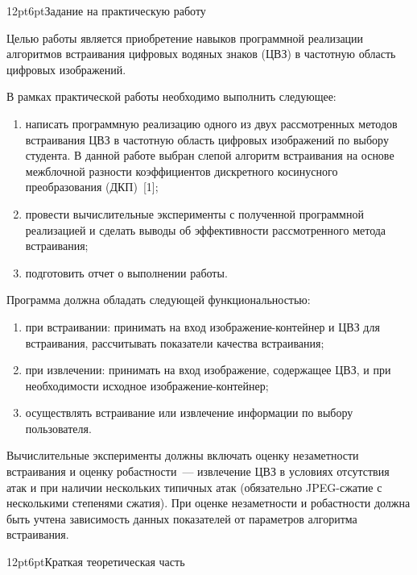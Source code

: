 \documentclass[12pt,a4paper]{article}
\makeatletter
\renewcommand\section{\@startsection{section}{1}{\z@}%
  {12pt}{6pt}{\normalfont\normalsize\bfseries}}
\makeatother
\begin{document}
\tableofcontents
\newpage

\section{Задание на практическую работу}

Целью работы является приобретение навыков программной реализации алгоритмов встраивания цифровых водяных знаков (ЦВЗ) в частотную область цифровых изображений.

В рамках практической работы необходимо выполнить следующее:
\begin{enumerate}
    \item написать программную реализацию одного из двух рассмотренных методов встраивания ЦВЗ в частотную область цифровых изображений по выбору студента. В данной работе выбран слепой алгоритм встраивания на основе межблочной разности коэффициентов дискретного косинусного преобразования (ДКП)~[1];
    \item провести вычислительные эксперименты с полученной программной реализацией и сделать выводы об эффективности рассмотренного метода встраивания;
    \item подготовить отчет о выполнении работы.
\end{enumerate}

Программа должна обладать следующей функциональностью:
\begin{enumerate}
    \item при встраивании: принимать на вход изображение-контейнер и ЦВЗ для встраивания, рассчитывать показатели качества встраивания;
    \item при извлечении: принимать на вход изображение, содержащее ЦВЗ, и при необходимости исходное изображение-контейнер;
    \item осуществлять встраивание или извлечение информации по выбору пользователя.
\end{enumerate}

Вычислительные эксперименты должны включать оценку незаметности встраивания и оценку робастности~--- извлечение ЦВЗ в условиях отсутствия атак и при наличии нескольких типичных атак (обязательно JPEG-сжатие с несколькими степенями сжатия). При оценке незаметности и робастности должна быть учтена зависимость данных показателей от параметров алгоритма встраивания.

\section{Краткая теоретическая часть}
\end{document}
